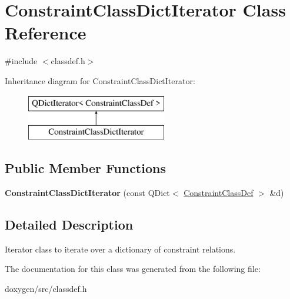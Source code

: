 \hypertarget{class_constraint_class_dict_iterator}{}\section{Constraint\+Class\+Dict\+Iterator Class Reference}
\label{class_constraint_class_dict_iterator}


{\ttfamily \#include $<$classdef.\+h$>$}

Inheritance diagram for Constraint\+Class\+Dict\+Iterator\+:\begin{figure}[H]
\begin{center}
\leavevmode
\includegraphics[height=2.000000cm]{class_constraint_class_dict_iterator}
\end{center}
\end{figure}
\subsection*{Public Member Functions}
\begin{DoxyCompactItemize}
\item 
\mbox{\label{class_constraint_class_dict_iterator_a1c31f9a44ed1331824400660e3092df9}} 
{\bfseries Constraint\+Class\+Dict\+Iterator} (const Q\+Dict$<$ \mbox{\hyperlink{struct_constraint_class_def}{Constraint\+Class\+Def}} $>$ \&d)
\end{DoxyCompactItemize}


\subsection{Detailed Description}
Iterator class to iterate over a dictionary of constraint relations. 

The documentation for this class was generated from the following file\+:\begin{DoxyCompactItemize}
\item 
doxygen/src/classdef.\+h\end{DoxyCompactItemize}
